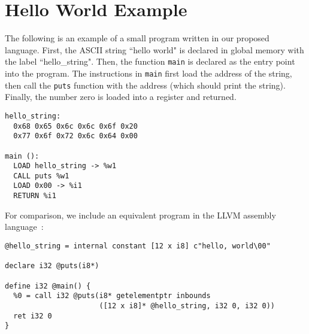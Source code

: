 \section{Hello World Example}

The following is an example of a small program written in our proposed language.
First, the ASCII string ``hello world" is declared in global memory
with the label ``hello\_string".
Then, the function \texttt{main} is declared as the entry point
into the program. The instructions in \texttt{main} first load the address
of the string, then call the \texttt{puts} function with the address
(which should print the string). Finally, the number zero is loaded
into a register and returned.
\begin{verbatim}
hello_string:
  0x68 0x65 0x6c 0x6c 0x6f 0x20
  0x77 0x6f 0x72 0x6c 0x64 0x00

main ():
  LOAD hello_string -> %w1
  CALL puts %w1
  LOAD 0x00 -> %i1
  RETURN %i1
\end{verbatim}
For comparison, we include an equivalent program in the LLVM assembly language~\cite{lattner2008llvm}:
\begin{verbatim}
@hello_string = internal constant [12 x i8] c"hello, world\00"

declare i32 @puts(i8*)

define i32 @main() {
  %0 = call i32 @puts(i8* getelementptr inbounds
                      ([12 x i8]* @hello_string, i32 0, i32 0))
  ret i32 0
}
\end{verbatim}
